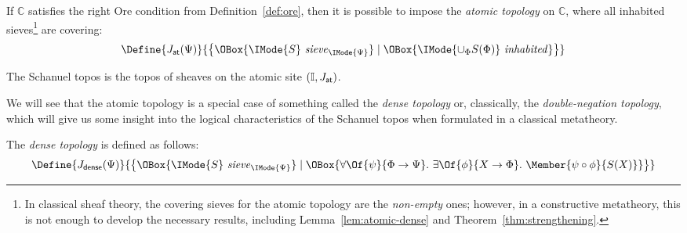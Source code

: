 \documentclass{article}
\newcommand\IsSieve[2]{\IMode{#2}\ \mathit{sieve}_{\IMode{#1}}}
\newcommand\JAtomic{J_{\mathsf{at}}}
\newcommand\JDense{J_{\mathsf{dense}}}
\begin{document}
\newcommand\IsInh[1]{\IMode{#1}\ \mathit{inhabited}}

\begin{definition}
  If $\mathbb{C}$ satisfies the right Ore condition from
  Definition~\ref{def:ore}, then it is possible to impose the
  \emph{atomic topology} on $\mathbb{C}$, where all inhabited
  sieves\footnote{In classical sheaf theory, the covering sieves for
    the atomic topology are the \emph{non-empty} ones; however, in a
    constructive metatheory, this is not enough to develop the
    necessary results, including Lemma~\ref{lem:atomic-dense} and
    Theorem~\ref{thm:strengthening}.}  are covering:
  \[
    \Define{
      \JAtomic(\Psi)
    }{
      \MkSet{
        \OBox{\IsSieve{\Psi}{S}}
        \mid
        \OBox{\IsInh{\cup_\Phi S(\Phi)}}
      }
    }
  \]
\end{definition}

\begin{definition}
  The Schanuel topos is the topos of sheaves on the atomic site
  $(\CatI,\JAtomic)$.
\end{definition}

We will see that the atomic topology is a special case of something
called the \emph{dense topology} or, classically, the
\emph{double-negation topology}, which will give us some insight into
the logical characteristics of the Schanuel topos when formulated in a
classical metatheory.

\newcommand\Forces[2]{\IMode{#1}\Vdash\IMode{#2}}

\begin{definition}
  The \emph{dense topology} is defined as follows:
  \[
    \Define{
      \JDense(\Psi)
    }{
      \MkSet{
        \OBox{
          \IsSieve{\Psi}{S}
        }
        \mid
        \OBox{
          \forall\Of{\psi}{\Phi\to\Psi}.\
          \exists\Of{\phi}{X\to\Phi}.\
          \Member{\psi\circ \phi}{S(X)}
        }
      }
    }
  \]
\end{definition}
\end{document}
